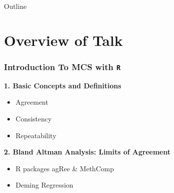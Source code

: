 \documentclass{beamer}
\title[Method Comparison Studies with \texttt{R}] %
\subtitle
{Include Only If Paper Has a Subtitle}
\author[Author, Another] %
{Kevin~O'Brien\inst{1} \and Dr. Kevin ~Hayes\inst{2}}
\institute[Universities of Limerick] %
{
  \inst{1}%
  Department of Mathematics and Statistics\\
  University of Limerick


\date[Dublin R] %
Dublin R, 2014}
\begin{document}
\begin{frame}
  \titlepage
\end{frame}

\begin{frame}{Outline}
  \tableofcontents
\end{frame}





\section{Overview of Talk}
\begin{frame}
\frametitle{Introduction To MCS with \texttt{R} }
\textbf{1. Basic Concepts and Definitions}

\begin{itemize}
\item Agreement
\item Consistency 
\item Repeatability
\end{itemize}

\textbf{2. Bland Altman Analysis: Limits of Agreement}
\begin{itemize}
\item R packages agRee \& MethComp
\item Deming Regression
\end{itemize}
\end{frame}
\end{document}
